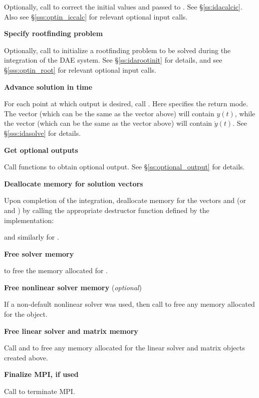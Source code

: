 \begin{Steps}
  Optionally, call  to correct the initial values
   and  passed to .  See \S\ref{ss:idacalcic}.
  Also see \S\ref{sss:optin_iccalc} for relevant optional input calls.

\item
  {\bf Specify rootfinding problem}

  Optionally, call  to initialize a rootfinding problem
  to be solved during the integration of the DAE system.
  See \S\ref{ss:idarootinit} for details, and see \S\ref{sss:optin_root}
  for relevant optional input calls.

\item
  {\bf Advance solution in time}

  For each point at which output is desired, call
  .
  Here  specifies the return mode.  The vector 
  (which can be the same as the vector  above) will contain $y(t)$,
  while the vector  (which can be the same as the vector 
  above) will contain $\dot{y}(t)$.
  See \S\ref{sss:idasolve} for details.

\item
  {\bf Get optional outputs}

  Call  functions to obtain optional output.
  See \S\ref{ss:optional_output} for details.

\item
  {\bf Deallocate memory for solution vectors}

  Upon completion of the integration, deallocate memory for the vectors 
  and  (or  and ) by calling the appropriate destructor
  function defined by the {\nvector} implementation:


  and similarly for .

\item
  {\bf Free solver memory}

   to free the memory allocated for {\idas}.

\item
  {\bf Free nonlinear solver memory} (\textit{optional})

  If a non-default nonlinear solver was used, then call
   to free any memory allocated for the
  {\sunnonlinsol} object.

\item
  {\bf Free linear solver and matrix memory}

  Call  and  to free any memory
  allocated for the linear solver and matrix objects created above.

\item
  {\bf Finalize MPI, if used}

  Call  to terminate MPI.

\end{Steps}

